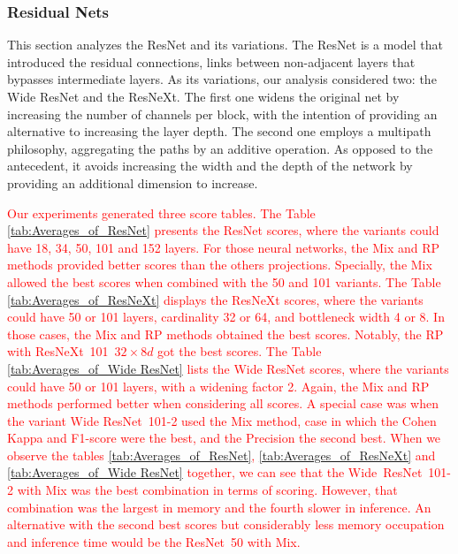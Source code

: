 




\FloatBarrier

\subsubsection{Residual Nets}

This section analyzes the ResNet and its variations. The ResNet is a model that introduced the residual connections, links between non-adjacent layers that bypasses intermediate layers. As its variations, our analysis considered two: the Wide ResNet and the ResNeXt. The first one widens the original net by increasing the number of channels per block, with the intention of providing an alternative to increasing the layer depth. The second one employs a multipath philosophy, aggregating the paths by an additive operation. As opposed to the antecedent, it avoids increasing the width and the depth of the network by providing an additional dimension to increase. 

\textcolor{red}{
Our experiments generated three score tables. 
The Table \ref{tab:Averages_of_ResNet} presents the ResNet scores, where the variants could have 18, 34, 50, 101 and 152 layers. For those neural networks, the \gls{Mix} and \gls{RP} methods provided better scores than the others projections. Specially, the \gls{Mix} allowed the best scores when combined with the 50 and 101 variants.
The Table \ref{tab:Averages_of_ResNeXt} displays the ResNeXt scores, where the variants could have 50 or 101 layers, cardinality 32 or 64, and bottleneck width 4 or 8. In those cases, the \gls{Mix} and \gls{RP} methods obtained the best scores. Notably, the \gls{RP} with \mbox{ResNeXt 101 $32\times 8d$} got the best scores. 
The Table \ref{tab:Averages_of_Wide ResNet} lists the Wide ResNet scores, where the variants could have 50 or 101 layers, with a widening factor 2. Again, the \gls{Mix} and \gls{RP} methods performed better when considering all scores. A special case was when the variant Wide \mbox{ResNet 101-2} used the \gls{Mix} method, case in which the Cohen Kappa and F1-score were the best, and the Precision the second best.    
When we observe the tables \ref{tab:Averages_of_ResNet}, \ref{tab:Averages_of_ResNeXt} and \ref{tab:Averages_of_Wide ResNet} together, we can see that the \mbox{Wide ResNet 101-2} with \gls{Mix} was the best combination in terms of scoring. However, that combination was the largest in memory and the fourth slower in inference. An alternative with the second best scores but considerably less memory occupation and inference time would be the \mbox{ResNet 50} with \gls{Mix}. 
}

